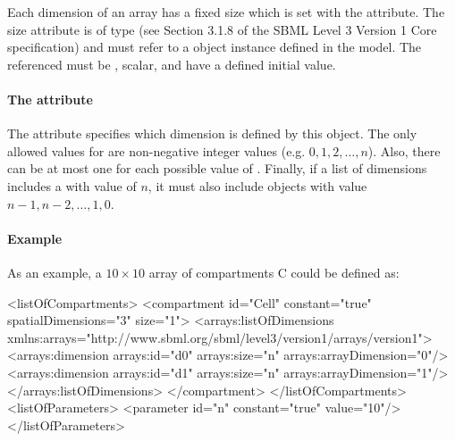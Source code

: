 Each dimension of an array has a fixed size which is set with the  attribute.   The size attribute is of type   (see Section 3.1.8 of the SBML Level 3 Version 1 Core specification) and must refer to a \Parameter object instance defined in the model.   The \Parameter referenced must be , scalar, and have a defined initial value.

\paragraph{The  attribute}

The  attribute specifies which dimension is defined by this \Dimension object.    
The only allowed values for  are non-negative integer values (e.g. $0,1,2,\dots,n$).   Also, there can be at most one \Dimension for each possible value of .   
Finally, if a list of dimensions includes a \Dimension with  value of $n$, it must also
include \Dimension objects with value $n-1, n-2, \dots , 1, 0$.

\paragraph{Example}

As an example, a $10 \times 10$ array of compartments C could be defined as:

\begin{example}
<listOfCompartments>
    <compartment id="Cell" constant="true" spatialDimensions="3" size="1">
        <arrays:listOfDimensions
            xmlns:arrays="http://www.sbml.org/sbml/level3/version1/arrays/version1">
            <arrays:dimension arrays:id="d0" arrays:size="n" arrays:arrayDimension="0"/>
            <arrays:dimension arrays:id="d1" arrays:size="n" arrays:arrayDimension="1"/>
        </arrays:listOfDimensions>
    </compartment>
</listOfCompartments>
<listOfParameters>
    <parameter id="n" constant="true" value="10"/>
</listOfParameters>
\end{example}


